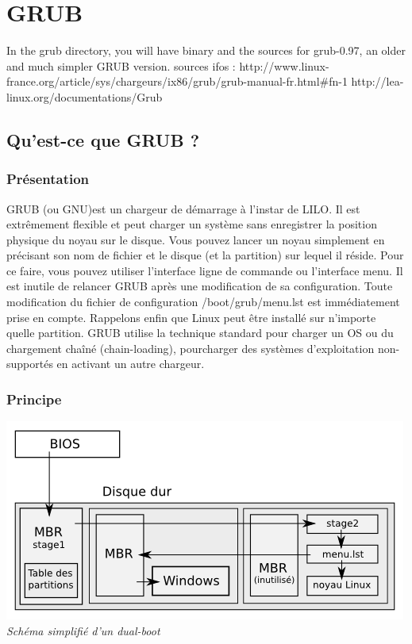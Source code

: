 \documentclass[10]{article}
\begin{document}
\section{GRUB} 

In the grub directory, you will have binary and the sources for
grub-0.97, an older and much simpler GRUB version.
sources ifos :
http://www.linux-france.org/article/sys/chargeurs/ix86/grub/grub-manual-fr.html\#fn-1
http://lea-linux.org/documentations/Grub

\subsection{Qu'est-ce que GRUB ?}
\subsubsection{Présentation}
GRUB (ou GNU)est un chargeur de d\'emarrage \`a  l'instar de LILO. Il est extr\^emement flexible et peut charger un syst\`eme sans enregistrer la position physique du noyau sur le disque. Vous pouvez lancer un noyau simplement en pr\'ecisant son nom de fichier et le disque (et la partition) sur lequel il r\'eside. Pour ce faire, vous pouvez utiliser l'interface ligne de commande ou l'interface menu. Il est inutile de relancer GRUB apr\`es une modification de sa configuration. Toute modification du fichier de configuration /boot/grub/menu.lst est imm\'ediatement prise en compte. Rappelons enfin que Linux peut être install\'e sur n'importe quelle partition. 
GRUB utilise la technique standard pour charger un OS ou du chargement chaîn\'e (chain-loading), pourcharger des syst\`emes d'exploitation non-support\'es en activant un autre chargeur.
\subsubsection{Principe}
\includegraphics{SchemaSimplifieGrubDualBoot}\\
\textit{Schéma simplifi\'e d'un dual-boot}
\end{document}
